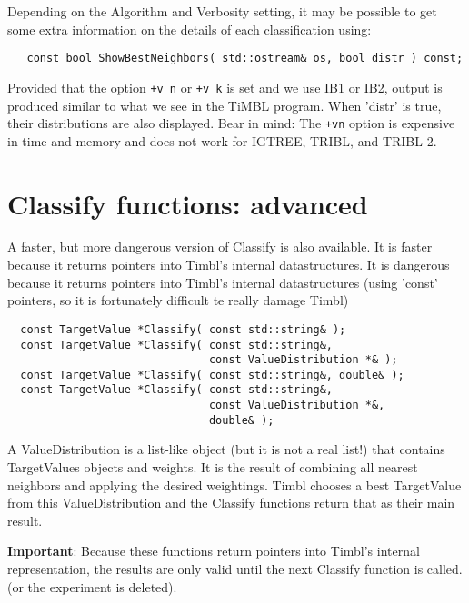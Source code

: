 \documentclass{report}
\begin{document}
Depending on the Algorithm and Verbosity setting, it may be possible
to get some extra information on the details of each classification
using:

\begin{footnotesize}
\begin{verbatim}
   const bool ShowBestNeighbors( std::ostream& os, bool distr ) const;
\end{verbatim}
\end{footnotesize}

Provided that the option {\tt +v n} or {\tt +v k} is set and we use
IB1 or IB2, output is produced similar to what we see in the TiMBL
program.  When 'distr' is true, their distributions are also
displayed.  Bear in mind: The {\tt +vn} option is expensive in time
and memory and does not work for IGTREE, TRIBL, and TRIBL-2.

\section{Classify functions: advanced}

A faster, but more dangerous version of Classify is also available.
It is faster because it returns pointers into Timbl's internal
datastructures. It is dangerous because it returns pointers into
Timbl's internal datastructures (using 'const' pointers, so it is
fortunately difficult te really damage Timbl)

\begin{footnotesize}
\begin{verbatim}
  const TargetValue *Classify( const std::string& );
  const TargetValue *Classify( const std::string&, 
                               const ValueDistribution *& );
  const TargetValue *Classify( const std::string&, double& );
  const TargetValue *Classify( const std::string&, 
                               const ValueDistribution *&, 
                               double& );
\end{verbatim}
\end{footnotesize}

A ValueDistribution is a list-like object (but it is not a real list!)
that contains TargetValues objects and weights. It is the result of
combining all nearest neighbors and applying the desired weightings.
Timbl chooses a best TargetValue from this ValueDistribution and the
Classify functions return that as their main result.

{\bf Important}: Because these functions return pointers into Timbl's
internal representation, the results are only valid until the next
Classify function is called. (or the experiment is deleted).
\end{document}

